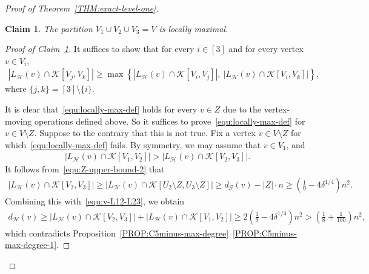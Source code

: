 \documentclass[11pt,a4paper]{article}
\newtheorem{claim}[definition]{Claim}
\theoremstyle{remark}
\begin{document}
\begin{proof}[Proof of Theorem~\ref{THM:exact-level-one}]
    \begin{claim}\label{CLAIM:V1V2V3-locally-max}
        The partition $V_1 \cup V_2 \cup V_3 = V$ is locally maximal. 
    \end{claim}
    \begin{proof}[Proof of Claim~\ref{CLAIM:V1V2V3-locally-max}]
        It suffices to show that for every $i \in [3]$ and for every vertex $v \in V_i$, 
        \begin{align}\label{equ:locally-max-def}
            |L_{\mathcal{H}}(v) \cap \mathcal{K}[V_j, V_k]|
            \ge \max\left\{|L_{\mathcal{H}}(v) \cap \mathcal{K}[V_i, V_j]|,~|L_{\mathcal{H}}(v) \cap \mathcal{K}[V_i, V_k]|\right\}, 
        \end{align}
        where $\{j,k\} = [3]\setminus \{i\}$. 
        
        It is clear that~\eqref{equ:locally-max-def} holds for every $v\in Z$ due to the vertex-moving operations defined above. 
        So it suffices to prove~\eqref{equ:locally-max-def} for $v \in V\setminus Z$. 
        Suppose to the contrary that this is not true. 
        Fix a vertex $v\in V\setminus Z$ for which~\eqref{equ:locally-max-def} fails. By symmetry, we may assume that $v\in V_1$, and 
        \begin{align}\label{equ:v-L12-L23}
            |L_{\mathcal{H}}(v) \cap \mathcal{K}[V_1, V_2]|
            > |L_{\mathcal{H}}(v) \cap \mathcal{K}[V_2, V_3]|.
        \end{align}
        It follows from~\eqref{equ:Z-upper-bound-2} that 
        \begin{align*}
            |L_{\mathcal{H}}(v) \cap \mathcal{K}[V_2, V_3]|
            \ge |L_{\mathcal{H}}(v) \cap \mathcal{K}[U_2\setminus Z, U_3\setminus Z]|
            \ge d_{\mathcal{G}}(v) - |Z| \cdot n
            \ge \left(\frac{1}{9} - 4\delta^{1/4}\right)n^2. 
        \end{align*}
        Combining this with~\eqref{equ:v-L12-L23}, we obtain 
        \begin{align*}
            d_{\mathcal{H}}(v)
            \ge |L_{\mathcal{H}}(v) \cap \mathcal{K}[V_2, V_3]| + |L_{\mathcal{H}}(v) \cap \mathcal{K}[V_1, V_2]|
            \ge 2 \left(\frac{1}{9} - 4\delta^{1/4}\right)n^2
            > \left(\frac{1}{8} + \frac{1}{100}\right)n^2,
        \end{align*}
        which contradicts Proposition~\ref{PROP:C5minus-max-degree}~\ref{PROP:C5minus-max-degree-1}.
    \end{proof}
    

\end{proof}
\end{document}
